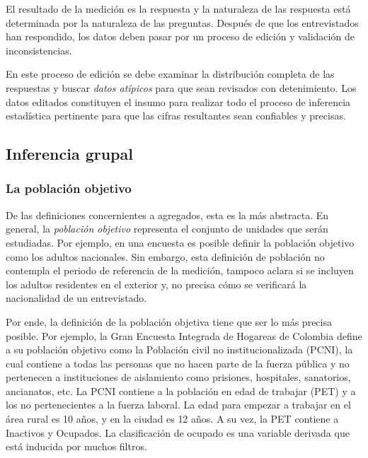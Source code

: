 \documentclass[
  12pt,
  spanish,
]{book}
\begin{document}
El resultado de la medición es la respuesta y la naturaleza de las respuesta está determinada por la naturaleza de las preguntas. Después de que los entrevistados han respondido, los datos deben pasar por un proceso de edición y validación de inconsistencias.

En este proceso de edición se debe examinar la distribución completa de las respuestas y buscar \emph{datos atípicos} para que sean revisados con detenimiento. Los datos editados constituyen el insumo para realizar todo el proceso de inferencia estadística pertinente para que las cifras resultantes sean confiables y precisas.

\hypertarget{inferencia-grupal}{%
\subsection{Inferencia grupal}\label{inferencia-grupal}}

\hypertarget{la-poblaciuxf3n-objetivo}{%
\subsubsection*{La población objetivo}\label{la-poblaciuxf3n-objetivo}}

De las definiciones concernientes a agregados, esta es la más abstracta. En general, la \emph{población objetivo} representa el conjunto de unidades que serán estudiadas. Por ejemplo, en una encuesta es posible definir la población objetivo como los adultos nacionales. Sin embargo, esta definición de población no contempla el periodo de referencia de la medición, tampoco aclara si se incluyen los adultos residentes en el exterior y, no precisa cómo se verificará la nacionalidad de un entrevistado.

Por ende, la definición de la población objetiva tiene que ser lo más precisa posible. Por ejemplo, la Gran Encuesta Integrada de Hogareas de Colombia define a su población objetivo como la Población civil no institucionalizada (PCNI), la cual contiene a todas las personas que no hacen parte de la fuerza pública y no pertenecen a instituciones de aislamiento como prisiones, hospitales, sanatorios, ancianatos, etc. La PCNI contiene a la población en edad de trabajar (PET) y a los no pertenecientes a la fuerza laboral. La edad para empezar a trabajar en el área rural es 10 años, y en la ciudad es 12 años. A su vez, la PET contiene a Inactivos y Ocupados. La clasificación de ocupado es una variable derivada que está inducida por muchos filtros.
\end{document}
